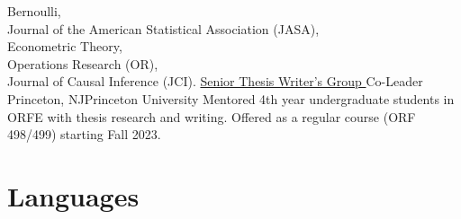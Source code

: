 \documentclass[10pt,a4paper,roman]{moderncv}        %
\begin{document}
{}
{
  Bernoulli,\\
  Journal of the American Statistical Association (JASA),\\
  Econometric Theory,\\
  Operations Research (OR),\\
  Journal of Causal Inference (JCI).
}
{\color{blue}\href{https://orfe.princeton.edu/undergraduate/stwg}{Senior Thesis
    Writer's Group }\color{black} Co-Leader}
{Princeton, NJ}{Princeton University}
{Mentored 4th year undergraduate students in ORFE with thesis research and
  writing. Offered as a regular course (ORF 498/499) starting Fall 2023.
}
\vspace{-0.3cm}
\section{Languages}
\begin{cvcolumns}
\end{cvcolumns}



\clearpage
\end{document}
